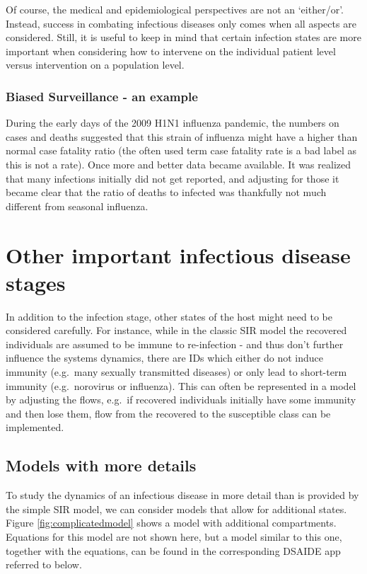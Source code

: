 \documentclass[]{book}
\theoremstyle{definition}
\theoremstyle{definition}
\theoremstyle{definition}
\theoremstyle{remark}
\begin{document}
Of course, the medical and epidemiological perspectives are not an
`either/or'. Instead, success in combating infectious diseases only
comes when all aspects are considered. Still, it is useful to keep in
mind that certain infection states are more important when considering
how to intervene on the individual patient level versus intervention on
a population level.

\subsubsection{Biased Surveillance - an example}\label{myexamplebox}

During the early days of the 2009 H1N1 influenza pandemic, the numbers
on cases and deaths suggested that this strain of influenza might have a
higher than normal case fatality ratio (the often used term case
fatality rate is a bad label as this is not a rate). Once more and
better data became available. It was realized that many infections
initially did not get reported, and adjusting for those it became clear
that the ratio of deaths to infected was thankfully not much different
from seasonal influenza.

\section{Other important infectious disease
stages}\label{other-important-infectious-disease-stages}

In addition to the infection stage, other states of the host might need
to be considered carefully. For instance, while in the classic SIR model
the recovered individuals are assumed to be immune to re-infection - and
thus don't further influence the systems dynamics, there are IDs which
either do not induce immunity (e.g.~many sexually transmitted diseases)
or only lead to short-term immunity (e.g.~norovirus or influenza). This
can often be represented in a model by adjusting the flows, e.g.~if
recovered individuals initially have some immunity and then lose them,
flow from the recovered to the susceptible class can be implemented.

\subsection{Models with more details}\label{models-with-more-details}

To study the dynamics of an infectious disease in more detail than is
provided by the simple SIR model, we can consider models that allow for
additional states. Figure \ref{fig:complicatedmodel} shows a model with
additional compartments. Equations for this model are not shown here,
but a model similar to this one, together with the equations, can be
found in the corresponding DSAIDE app referred to below.
\end{document}

